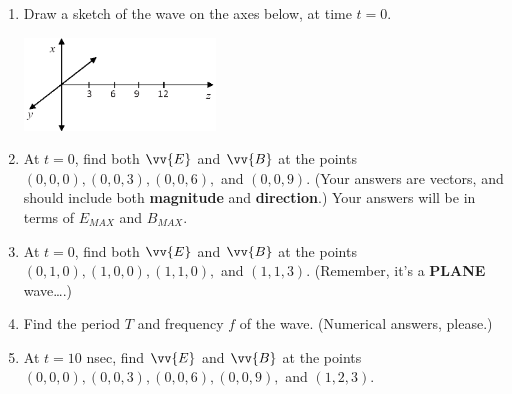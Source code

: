 \begin{enumerate}
\item Draw a sketch of the wave on the axes below, at time $t=0$.
\begin{center}
\includegraphics[width=0.4\textwidth]{plane_waves/em_waves_axes.eps}
\end{center}

\item At $t=0$, find both $\vv {E}$ and $\vv {B}$ at the points $(0,0,0), (0,0,3), (0,0,6),$ and $(0,0,9)$.  (Your answers are vectors, and should include both \textbf{magnitude} and \textbf{direction}.)  Your answers will be in terms of
$E_{MAX}$ and $B_{MAX}$.
\vspace{1.0in}

\item At $t=0$, find both $\vv {E}$ and $\vv {B}$ at the points $(0,1,0), (1,0,0), (1,1,0),$ and $(1,1,3)$.  (Remember, it's a \textbf{PLANE} wave….)
\vspace{1.0in}

\item Find the period $T$ and frequency $f$ of the wave.  (Numerical answers, please.)
\vspace{1.0in}

\item At $t=10$ nsec, find $\vv {E}$ and $\vv {B}$ at the points $(0,0,0), (0,0,3), (0,0,6), (0,0,9),$ and $(1,2,3)$.  
\vspace{1.0in}
\end{enumerate}


